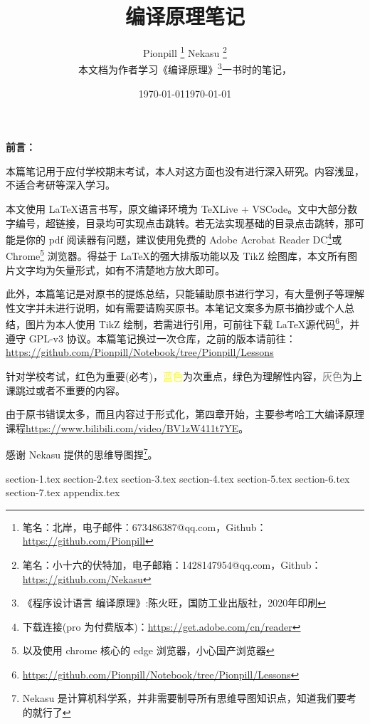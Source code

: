 \documentclass{PionpillNote-art}
\title{编译原理笔记}
\author{
    Pionpill \footnote{笔名：北岸，电子邮件：673486387@qq.com，Github：\url{https://github.com/Pionpill}} \quad Nekasu \footnote{笔名：小十六的伏特加，电子邮箱：1428147954@qq.com，Github：\url{https://github.com/Nekasu}} \\
    本文档为作者学习《编译原理》\footnote{《程序设计语言 编译原理》:陈火旺，国防工业出版社，2020年印刷}一书时的笔记，\\
}
\date{\today}
\begin{document}
\maketitle

\noindent\textbf{前言：}

本篇笔记用于应付学校期末考试，本人对这方面也没有进行深入研究。内容浅显，不适合考研等深入学习。

本文使用 \LaTeX 语言书写，原文编译环境为 TeXLive + VSCode。文中大部分数字编号，超链接，目录均可实现点击跳转。若无法实现基础的目录点击跳转，那可能是你的 pdf 阅读器有问题，建议使用免费的 Adobe Acrobat Reader DC\footnote{下载连接(pro 为付费版本)：\url{https://get.adobe.com/cn/reader}}或 Chrome\footnote{以及使用 chrome 核心的 edge 浏览器，小心国产浏览器} 浏览器。得益于 \LaTeX 的强大排版功能以及 TikZ 绘图库，本文所有图片文字均为矢量形式，如有不清楚地方放大即可。

此外，本篇笔记是对原书的提炼总结，只能辅助原书进行学习，有大量例子等理解性文字并未进行说明，如有需要请购买原书。本笔记文案多为原书摘抄或个人总结，图片为本人使用 TikZ 绘制，若需进行引用，可前往下载 \LaTeX 源代码\footnote{\url{https://github.com/Pionpill/Notebook/tree/Pionpill/Lessons}}，并遵守 GPL-v3 协议。本篇笔记换过一次仓库，之前的版本请前往：\url{https://github.com/Pionpill/Notebook/tree/Pionpill/Lessons}

针对学校考试，\textcolor{imp}{红色}为重要(必考)，\textcolor{mark}{蓝色}为次重点，\textcolor{tip}{绿色}为理解性内容，\textcolor{grey}{灰色}为上课跳过或者不重要的内容。

由于原书错误太多，而且内容过于形式化，第四章开始，主要参考哈工大编译原理课程\url{https://www.bilibili.com/video/BV1zW411t7YE}。

感谢 Nekasu 提供的思维导图捏\footnote{Nekasu 是计算机科学系，并非需要制导所有思维导图知识点，知道我们要考的就行了}。

\date{\today}

\newpage

\tableofcontents
\thispagestyle{empty}
\newpage
\setcounter{page}{1}

{section-1.tex}
{section-2.tex}
{section-3.tex}
{section-4.tex}
{section-5.tex}
{section-6.tex}
{section-7.tex}
{appendix.tex}
\end{document}

